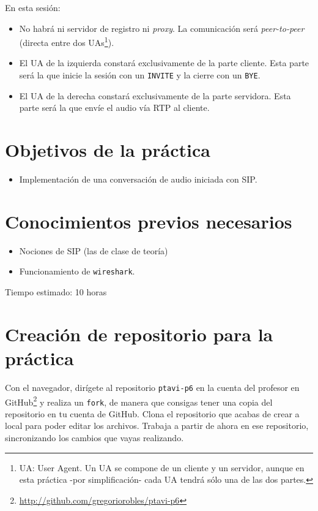 \documentclass[a4paper,11pt]{article}
\begin{document}
En esta sesión:

\begin{itemize}
  \item No habrá ni servidor de registro ni \emph{proxy}. La comunicación será \emph{peer-to-peer} (directa entre dos UAs\footnote{UA: User Agent. Un UA se compone de un cliente y un servidor, aunque en esta práctica -por simplificación- cada UA tendrá sólo una de las dos partes.}).
  \item El UA de la izquierda constará exclusivamente de la parte cliente. Esta parte será la que inicie la sesión con un \texttt{INVITE} y la cierre con un \texttt{BYE}.
  \item El UA de la derecha constará exclusivamente de la parte servidora. Esta parte será la que envíe el audio vía RTP al cliente.
\end{itemize}


\section*{Objetivos de la práctica}

\begin{itemize}
  \item Implementación de una conversación de audio iniciada con SIP.
\end{itemize}

\section*{Conocimientos previos necesarios}

\begin{itemize}
  \item Nociones de SIP (las de clase de teoría)
  \item Funcionamiento de \texttt{wireshark}.
\end{itemize}

Tiempo estimado: 10 horas

\section*{Creación de repositorio para la práctica}

Con el navegador, dirígete al repositorio \texttt{ptavi-p6} en la cuenta del profesor en GitHub\footnote{\url{http://github.com/gregoriorobles/ptavi-p6}} y realiza un \texttt{fork}, de manera que consigas tener una copia del repositorio en tu cuenta de GitHub. Clona el repositorio que acabas de crear a local para poder editar los archivos. Trabaja a partir de ahora en ese repositorio, sincronizando los cambios que vayas realizando.
\end{document}
